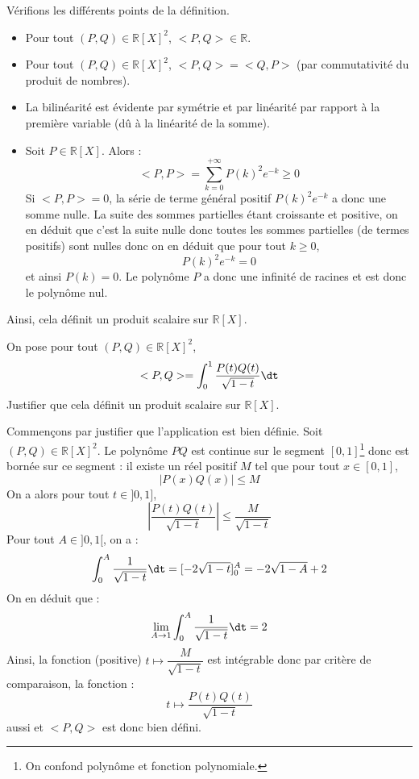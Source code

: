 \documentclass[a4paper,10pt]{report}
\begin{document}
\noindent Vérifions les différents points de la définition.

\begin{itemize}
\item Pour tout $(P,Q) \in \mathbb{R}[X]^2$, $<P,Q> \in \mathbb{R}$.
\item Pour tout $(P,Q) \in \mathbb{R}[X]^2$, $<P,Q>= <Q,P>$ (par commutativité du produit de nombres).
\item La bilinéarité est évidente par symétrie et par linéarité par rapport à la première variable (dû à la linéarité de la somme).
\item Soit $P \in \mathbb{R}[X]$. Alors :
$$ <P,P> = \sum_{k=0}^{+\infty} P(k)^2 e^{-k} \geq 0$$
Si $<P,P>=0$, la série de terme général positif $P(k)^2 e^{-k}$ a donc une somme nulle. La suite des sommes partielles étant croissante et positive, on en déduit que c'est la suite nulle donc toutes les sommes partielles (de termes positifs) sont nulles donc on en déduit que pour tout $k \geq 0$,
$$ P(k)^2 e^{-k} = 0$$
et ainsi $P(k)=0$. Le polynôme $P$ a donc une infinité de racines et est donc le polynôme nul.
\end{itemize}
Ainsi, cela définit un produit scalaire sur $\mathbb{R}[X]$.




\begin{Exa}\label{PS} On pose pour tout $(P,Q) \in \mathbb{R}[X]^2$,
$$ <P,Q> = \int_{0}^1 \dfrac{P(t)Q(t)}{\sqrt{1-t}} \dt $$
Justifier que cela définit un produit scalaire sur $\mathbb{R}[X]$.
\end{Exa}

\corr Commençons par justifier que l'application est bien définie. Soit $(P,Q) \in \mathbb{R}[X]^2$. Le polynôme $PQ$ est continue sur le segment $[0,1]$\footnote{On confond polynôme et fonction polynomiale.} donc est bornée sur ce segment : il existe un réel positif $M$ tel que pour tout $x \in [0,1]$,
$$ \vert P(x)Q(x) \vert \leq M$$
On a alors pour tout $t \in ]0,1]$,
$$ \left\vert  \dfrac{P(t)Q(t)}{\sqrt{1-t}} \right\vert \leq \dfrac{M}{\sqrt{1-t}}$$
Pour tout $A \in ]0,1[$, on a :
$$ \int_{0}^A \dfrac{1}{\sqrt{1-t}} \dt = [-2 \sqrt{1-t}]_0^A = - 2 \sqrt{1-A}+2$$
On en déduit que :
$$ \lim_{A \rightarrow 1}  \int_{0}^A \dfrac{1}{\sqrt{1-t}} \dt = 2$$
Ainsi, la fonction (positive) $t \mapsto \dfrac{M}{\sqrt{1-t}}$ est intégrable donc par critère de comparaison, la fonction :
$$ t \mapsto  \dfrac{P(t)Q(t)}{\sqrt{1-t}} $$
aussi et $<P,Q>$ est donc bien défini.

\medskip
\end{document}
